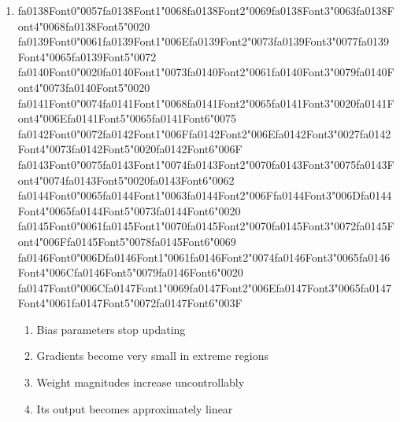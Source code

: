 \documentclass[12pt]{article}
\begin{document}
\begin{enumerate}[label=Q\arabic*.]
 \item {\csname fa0138Font0\endcsname\char"0057}{\csname fa0138Font1\endcsname\char"0068}{\csname fa0138Font2\endcsname\char"0069}{\csname fa0138Font3\endcsname\char"0063}{\csname fa0138Font4\endcsname\char"0068}{\csname fa0138Font5\endcsname\char"0020} {\csname fa0139Font0\endcsname\char"0061}{\csname fa0139Font1\endcsname\char"006E}{\csname fa0139Font2\endcsname\char"0073}{\csname fa0139Font3\endcsname\char"0077}{\csname fa0139Font4\endcsname\char"0065}{\csname fa0139Font5\endcsname\char"0072} {\csname fa0140Font0\endcsname\char"0020}{\csname fa0140Font1\endcsname\char"0073}{\csname fa0140Font2\endcsname\char"0061}{\csname fa0140Font3\endcsname\char"0079}{\csname fa0140Font4\endcsname\char"0073}{\csname fa0140Font5\endcsname\char"0020} {\csname fa0141Font0\endcsname\char"0074}{\csname fa0141Font1\endcsname\char"0068}{\csname fa0141Font2\endcsname\char"0065}{\csname fa0141Font3\endcsname\char"0020}{\csname fa0141Font4\endcsname\char"006E}{\csname fa0141Font5\endcsname\char"0065}{\csname fa0141Font6\endcsname\char"0075} {\csname fa0142Font0\endcsname\char"0072}{\csname fa0142Font1\endcsname\char"006F}{\csname fa0142Font2\endcsname\char"006E}{\csname fa0142Font3\endcsname\char"0027}{\csname fa0142Font4\endcsname\char"0073}{\csname fa0142Font5\endcsname\char"0020}{\csname fa0142Font6\endcsname\char"006F} {\csname fa0143Font0\endcsname\char"0075}{\csname fa0143Font1\endcsname\char"0074}{\csname fa0143Font2\endcsname\char"0070}{\csname fa0143Font3\endcsname\char"0075}{\csname fa0143Font4\endcsname\char"0074}{\csname fa0143Font5\endcsname\char"0020}{\csname fa0143Font6\endcsname\char"0062} {\csname fa0144Font0\endcsname\char"0065}{\csname fa0144Font1\endcsname\char"0063}{\csname fa0144Font2\endcsname\char"006F}{\csname fa0144Font3\endcsname\char"006D}{\csname fa0144Font4\endcsname\char"0065}{\csname fa0144Font5\endcsname\char"0073}{\csname fa0144Font6\endcsname\char"0020} {\csname fa0145Font0\endcsname\char"0061}{\csname fa0145Font1\endcsname\char"0070}{\csname fa0145Font2\endcsname\char"0070}{\csname fa0145Font3\endcsname\char"0072}{\csname fa0145Font4\endcsname\char"006F}{\csname fa0145Font5\endcsname\char"0078}{\csname fa0145Font6\endcsname\char"0069} {\csname fa0146Font0\endcsname\char"006D}{\csname fa0146Font1\endcsname\char"0061}{\csname fa0146Font2\endcsname\char"0074}{\csname fa0146Font3\endcsname\char"0065}{\csname fa0146Font4\endcsname\char"006C}{\csname fa0146Font5\endcsname\char"0079}{\csname fa0146Font6\endcsname\char"0020} {\csname fa0147Font0\endcsname\char"006C}{\csname fa0147Font1\endcsname\char"0069}{\csname fa0147Font2\endcsname\char"006E}{\csname fa0147Font3\endcsname\char"0065}{\csname fa0147Font4\endcsname\char"0061}{\csname fa0147Font5\endcsname\char"0072}{\csname fa0147Font6\endcsname\char"003F}
 \begin{enumerate}[label=(\Alph*)]
     \item Bias parameters stop updating
     \item Gradients become very small in extreme regions
     \item Weight magnitudes increase uncontrollably
     \item Its output becomes approximately linear
 \end{enumerate}
 

\end{enumerate}
\end{document}
